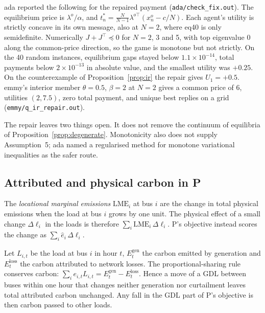\documentclass{article}
\begin{document}
ada reported the following for the repaired payment (\texttt{ada/check\_fix.out}).
The equilibrium price is \(\lambda^o/\alpha\), and \(t^*_n=\frac{N}{N-1}\lambda^{o\top}(x^o_n-c/N)\).
Each agent's utility is strictly concave in its own message, also at \(N=2\), where eq40 is only semidefinite.
Numerically \(J+J^\top\preceq0\) for \(N=2\), 3 and 5, with top eigenvalue 0 along the common-price direction, so the game is monotone but not strictly.
On the 40 random instances, equilibrium gaps stayed below \(1.1\times10^{-14}\), total payments below \(2\times10^{-13}\) in absolute value, and the smallest utility was \(+0.25\).
On the counterexample of Proposition~\ref{prop:ir} the repair gives \(U_1=+0.5\).
emmy's interior member \(\theta=0.5\), \(\beta=2\) at \(N=2\) gives a common price of 6, utilities \((2,7.5)\), zero total payment, and unique best replies on a grid (\texttt{emmy/q\_ir\_repair.out}).

The repair leaves two things open.
It does not remove the continuum of equilibria of Proposition~\ref{prop:degenerate}.
Monotonicity also does not supply Assumption~5; ada named a regularised method for monotone variational inequalities as the safer route.

\subsection{Attributed and physical carbon in P}\label{sec:carbon}

The \emph{locational marginal emissions} \(\mathrm{LME}_i\) at bus \(i\) are the change in total physical emissions when the load at bus \(i\) grows by one unit.
The physical effect of a small change \(\Delta\ell_i\) in the loads is therefore \(\sum_i\mathrm{LME}_i\,\Delta\ell_i\).
P's objective instead scores the change as \(\sum_i\hat e_i\,\Delta\ell_i\).

\begin{proposition}\label{prop:cef}
Let \(L_{i,t}\) be the load at bus \(i\) in hour \(t\), \(E^{\mathrm{gen}}_t\) the carbon emitted by generation and \(E^{\mathrm{loss}}_t\) the carbon attributed to network losses.
The proportional-sharing rule conserves carbon: \(\sum_ie_{i,t}L_{i,t}=E^{\mathrm{gen}}_t-E^{\mathrm{loss}}_t\).
Hence a move of a GDL between buses within one hour that changes neither generation nor curtailment leaves total attributed carbon unchanged.
Any fall in the GDL part of P's objective is then carbon passed to other loads.
\end{proposition}
\end{document}
